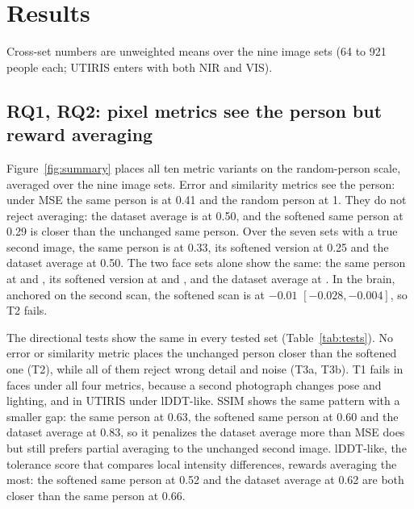 \section{Results}
\label{sec:results}

Cross-set numbers are unweighted means over the nine image sets (64 to 921 people each; UTIRIS enters with both \ac{NIR} and \ac{VIS}).

\subsection{RQ1, RQ2: pixel metrics see the person but reward averaging}
\label{sec:r-cross}
Figure~\ref{fig:summary} places all ten metric variants on the random-person scale, averaged over the nine image sets.
Error and similarity metrics see the person: under \ac{MSE} the same person is at 0.41 and the random person at 1\statuspre.
They do not reject averaging: the dataset average is at 0.50, and the softened same person at 0.29 is closer than the unchanged same person\statuspre.
Over the seven sets with a true second image, the same person is at 0.33, its softened version at 0.25 and the dataset average at 0.50.
The two face sets alone show the same: the same person at \mfLamaHqCelebaRefRepeatMse{} and \mfLamaHqImdbRefRepeatMse{}, its softened version at \mfLamaHqCelebaRefSoftMse{} and \mfLamaHqImdbRefSoftMse{}, and the dataset average at \mfLamaHqCelebaRefMeanMse{}.
In the brain, anchored on the second scan, the softened scan is at $-0.01$ $[-0.028,-0.004]$, so T2 fails\statuspre.

The directional tests show the same in every tested set (Table~\ref{tab:tests}).
No error or similarity metric places the unchanged person closer than the softened one (T2), while all of them reject wrong detail and noise (T3a, T3b).
T1 fails in faces under all four metrics, because a second photograph changes pose and lighting, and in UTIRIS under \ac{lDDT}-like\statuspre.
\ac{SSIM} shows the same pattern with a smaller gap: the same person at 0.63, the softened same person at 0.60 and the dataset average at 0.83, so it penalizes the dataset average more than \ac{MSE} does but still prefers partial averaging to the unchanged second image.
\ac{lDDT}-like, the tolerance score that compares local intensity differences, rewards averaging the most: the softened same person at 0.52 and the dataset average at 0.62 are both closer than the same person at 0.66.
